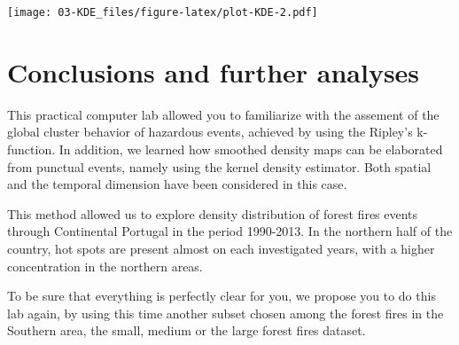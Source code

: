 \documentclass[
]{book}
\newenvironment{Shaded}{\begin{snugshade}}{\end{snugshade}}
\newcommand{\AttributeTok}[1]{\textcolor[rgb]{0.13,0.29,0.53}{#1}}
\newcommand{\CommentTok}[1]{\textcolor[rgb]{0.56,0.35,0.01}{\textit{#1}}}
\newcommand{\ControlFlowTok}[1]{\textcolor[rgb]{0.13,0.29,0.53}{\textbf{#1}}}
\newcommand{\DecValTok}[1]{\textcolor[rgb]{0.00,0.00,0.81}{#1}}
\newcommand{\FunctionTok}[1]{\textcolor[rgb]{0.13,0.29,0.53}{\textbf{#1}}}
\newcommand{\NormalTok}[1]{#1}
\newcommand{\OtherTok}[1]{\textcolor[rgb]{0.56,0.35,0.01}{#1}}
\newcommand{\SpecialCharTok}[1]{\textcolor[rgb]{0.81,0.36,0.00}{\textbf{#1}}}
\newcommand{\StringTok}[1]{\textcolor[rgb]{0.31,0.60,0.02}{#1}}
\begin{document}
\begin{Shaded}
\end{Shaded}

\texttt{[image: 03-KDE\_files/figure-latex/plot-KDE-2.pdf]}

\hypertarget{conclusions-and-further-analyses-1}{%
\section{Conclusions and further analyses}\label{conclusions-and-further-analyses-1}}

This practical computer lab allowed you to familiarize with the assement of the global cluster behavior of hazardous events, achieved by using the Ripley's k-function.
In addition, we learned how smoothed density maps can be elaborated from punctual events, namely using the kernel density estimator.
Both spatial and the temporal dimension have been considered in this case.

This method allowed us to explore density distribution of forest fires events through Continental Portugal in the period 1990-2013.
In the northern half of the country, hot spots are present almost on each investigated years, with a higher concentration in the northern areas.

To be sure that everything is perfectly clear for you, we propose you to do this lab again, by using this time another subset chosen among the forest fires in the Southern area, the small, medium or the large forest fires dataset.
\end{document}
